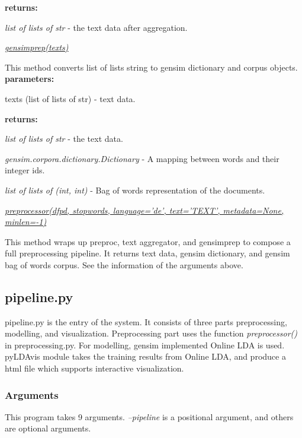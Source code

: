 \documentclass{article} %
\begin{document}
\textbf{returns:}
\begin{compactitem}
      \item \textit{list of lists of str} - the text data after aggregation.
\end{compactitem}

\underline{\textit{gensim\textunderscore{}prep(texts)}}

This method converts list of lists string to gensim dictionary and corpus objects.
\textbf{parameters: }
\begin{compactitem}
      \item texts (list of lists of str) - text data.
\end{compactitem}

\textbf{returns:}
\begin{compactitem}
      \item \textit{list of lists of str} - the text data.
      \item \textit{gensim.corpora.dictionary.Dictionary} - A mapping between words and their integer ids.
      \item \textit{list of lists of (int, int)} - Bag of words representation of the documents.
\end{compactitem}

\underline{\textit{preprocessor(df\textunderscore{}pd, stopwords, language='de', text='TEXT', metadata=None, min\textunderscore{}len=-1)}}

This method wraps up preproc, text aggregator, and gensim\textunderscore{}prep to compose a full preprocessing pipeline. It returns text data, gensim dictionary, and gensim bag of words corpus. See the information of the arguments above.

\subsection{pipeline.py}
pipeline.py is the entry of the system. It consists of three parts preprocessing, modelling, and visualization. Preprocessing part uses the function \textit{preprocessor()} in preprocessing.py. For modelling, gensim implemented Online LDA is used. pyLDAvis module takes the training results from Online LDA, and produce a html file which supports interactive visualization.

\subsubsection{Arguments}
This program takes 9 arguments. \textit{--pipeline} is a positional argument, and others are optional arguments.
\end{document}
